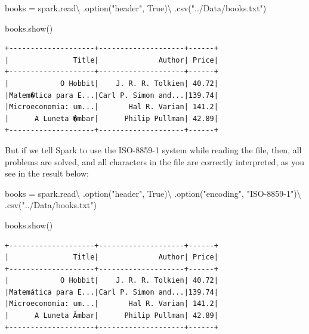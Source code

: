 \documentclass[
  11pt,
  letterpaper,
  DIV=11,
  numbers=noendperiod]{scrreprt}
\newenvironment{Shaded}{\begin{snugshade}}{\end{snugshade}}
\newcommand{\NormalTok}[1]{\textcolor[rgb]{0.00,0.23,0.31}{#1}}
\newcommand{\OperatorTok}[1]{\textcolor[rgb]{0.37,0.37,0.37}{#1}}
\newcommand{\StringTok}[1]{\textcolor[rgb]{0.13,0.47,0.30}{#1}}
\newcommand{\VariableTok}[1]{\textcolor[rgb]{0.07,0.07,0.07}{#1}}
\begin{document}
\begin{Shaded}
\begin{Highlighting}[]
\NormalTok{books }\OperatorTok{=}\NormalTok{ spark.read}\OperatorTok{\textbackslash{}}
\NormalTok{  .option(}\StringTok{"header"}\NormalTok{, }\VariableTok{True}\NormalTok{)}\OperatorTok{\textbackslash{}}
\NormalTok{  .csv(}\StringTok{"../Data/books.txt"}\NormalTok{)}
  
\NormalTok{books.show()}
\end{Highlighting}
\end{Shaded}

\begin{verbatim}
+--------------------+--------------------+------+
|               Title|              Author| Price|
+--------------------+--------------------+------+
|            O Hobbit|    J. R. R. Tolkien| 40.72|
|Matem�tica para E...|Carl P. Simon and...|139.74|
|Microeconomia: um...|       Hal R. Varian| 141.2|
|      A Luneta �mbar|      Philip Pullman| 42.89|
+--------------------+--------------------+------+
\end{verbatim}

But if we tell Spark to use the ISO-8859-1 system while reading the
file, then, all problems are solved, and all characters in the file are
correctly interpreted, as you see in the result below:

\begin{Shaded}
\begin{Highlighting}[]
\NormalTok{books }\OperatorTok{=}\NormalTok{ spark.read}\OperatorTok{\textbackslash{}}
\NormalTok{  .option(}\StringTok{"header"}\NormalTok{, }\VariableTok{True}\NormalTok{)}\OperatorTok{\textbackslash{}}
\NormalTok{  .option(}\StringTok{"encoding"}\NormalTok{, }\StringTok{"ISO{-}8859{-}1"}\NormalTok{)}\OperatorTok{\textbackslash{}}
\NormalTok{  .csv(}\StringTok{"../Data/books.txt"}\NormalTok{)}
  
\NormalTok{books.show()}
\end{Highlighting}
\end{Shaded}

\begin{verbatim}
+--------------------+--------------------+------+
|               Title|              Author| Price|
+--------------------+--------------------+------+
|            O Hobbit|    J. R. R. Tolkien| 40.72|
|Matemática para E...|Carl P. Simon and...|139.74|
|Microeconomia: um...|       Hal R. Varian| 141.2|
|      A Luneta Âmbar|      Philip Pullman| 42.89|
+--------------------+--------------------+------+
\end{verbatim}
\end{document}
